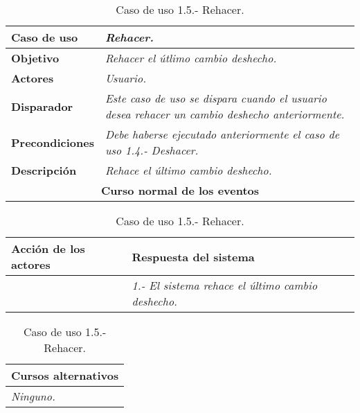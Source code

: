    \begin{table}[!ht] %
      \centering
      \begin{tabular}{|p{4cm}|p{11.5cm}|}
      \hline
      \textbf{Caso de uso} & \textit{Rehacer.}\\ \hline
      \textbf{Objetivo} & \textit{Rehacer el útlimo cambio deshecho.}\\
      \textbf{Actores} & \textit{Usuario.}\\ \hline
      \textbf{Disparador} & \textit{Este caso de uso se dispara cuando el usuario desea rehacer un cambio deshecho anteriormente.}\\ \hline
      \textbf{Precondiciones} & \textit{Debe haberse ejecutado anteriormente el caso de uso 1.4.- Deshacer.}\\ \hline
      \textbf{Descripción} & \textit{Rehace el último cambio deshecho.}\\ \hline
      \multicolumn{2}{|c|}{\textbf{Curso normal de los eventos}}\\ \hline
    \end{tabular}
    \begin{tabular}{|p{7.75cm}|p{7.75cm}|}
      \hspace{2cm}\textbf{Acción de los actores} & \hspace{1.75cm}\textbf{Respuesta del sistema}\\ \hline
            & \textit{1.- El sistema rehace el último cambio deshecho.} \\ \hline
    \end{tabular}
    \begin{tabular}{|p{15.9cm}|}
      \hspace{6cm}\textbf{Cursos alternativos}\\ \hline     
      \textit{Ninguno.}\\ \hline
    \end{tabular}
    \caption{Caso de uso 1.5.- Rehacer.}
   \end{table}


